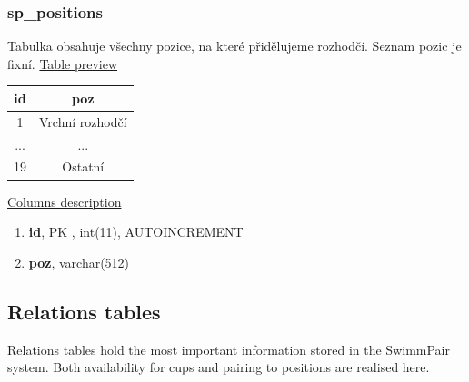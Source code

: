 \subsubsection*{sp\_positions}
Tabulka obsahuje všechny pozice, na které přidělujeme rozhodčí. Seznam pozic je fixní.
\newline
\underline{Table preview}
\begin{center}
 \begin{tabular}{||c c||} 
 \hline
 id & poz  \\ [0.5ex] 
 \hline\hline
 1 & Vrchní rozhodčí \\ 
 \hline
 ... & ...  \\ 
\hline
 19 & Ostatní  \\ [1ex] 
 \hline
\end{tabular}
\end{center}
\underline{Columns description}
\begin{enumerate}
  \setlength\itemsep{0em}
  \item \textbf{id}, PK , int(11), AUTOINCREMENT
  \item \textbf{poz}, varchar(512)
\end{enumerate}

\subsection{Relations tables}
Relations tables hold the most important information stored in the SwimmPair system. Both availability for cups and pairing to positions are realised here.

